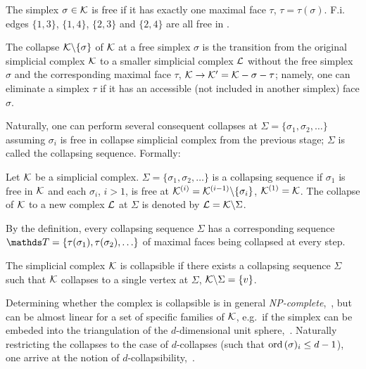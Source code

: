 \begin{definition}\label{def:free}
      The simplex \(\sigma \in \mathcal{K} \) is {free} if it has exactly one maximal face \( \tau \), \( \tau = \tau(\sigma) \). F.i. edges \( \{ 1, 3 \} \), \( \{ 1, 4 \} \), \( \{ 2, 3 \} \) and \( \{ 2, 4 \} \) are all free in .
\end{definition} 

 The {collapse} \( \mathcal{K} \backslash \{ \sigma \} \) of \( \mathcal{K} \) at a free simplex \( \sigma \) is the transition from the original simplicial complex \( \mathcal{K} \) to a smaller simplicial complex \( \mathcal{L} \) without the free simplex \( \sigma \) and the corresponding maximal face \( \tau \), \( \mathcal{K} \to \mathcal{K}' = \mathcal{K} - \sigma - \tau \); namely, one can eliminate a simplex \( \tau \) if it has an accessible (not included in another simplex) face \(\sigma\).

Naturally, one can perform several consequent collapses at  \( \Sigma = \{ \sigma_1, \sigma_2, \ldots \} \) assuming \( \sigma_i \) is free in collapse simplicial complex from the previous stage; \( \Sigma \) is called the {collapsing sequence}. Formally:
 \begin{definition}
       Let \( \mathcal{K} \) be a simplicial complex. \( \Sigma = \{ \sigma_1, \sigma_2, \ldots \} \) is a {collapsing sequence} if \( \sigma_1 \) is free in \( \mathcal{K} \) and each \( \sigma_i \), \( i > 1 \), is free at 
       \( \mathcal{K}^{(i)} = \mathcal{K}^{(i-1)} \backslash \{ \sigma_i \} \), \( \mathcal{K}^{(1)} = \mathcal{K} \). The collapse of \( \mathcal{K} \) to a new complex \( \mathcal{L} \) at \( \Sigma \) is denoted by \( \mathcal{L} = \mathcal{K} \backslash \Sigma \).
 \end{definition}
 By the definition, every collapsing sequence \( \Sigma \) has a corresponding sequence \( \ds T = \{ \tau(\sigma_1), \tau(\sigma_2), \ldots \} \) of maximal faces being collapsed at every step.

 \begin{definition}
      The simplicial complex \( \mathcal{K} \) is {collapsible} if there exists a collapsing sequence \( \Sigma \) such that \( \mathcal{K} \) collapses to a single vertex at \( \Sigma \), \( \mathcal{K} \backslash \Sigma = \{ v \} \).
\end{definition}

Determining whether the complex is collapsible is in general \emph{NP-complete},~\cite{tancerRecognitionCollapsibleComplexes2016}, but can be almost linear for a set of specific families of \( \mathcal{K} \), e.g.\ if the simplex can be embeded into the triangulation of the \(d\)-dimensional unit sphere,~\cite{cohenSolving1laplaciansNearly2014}. Naturally restricting the collapses to the case of \(d\)-collapses (such that \( \mathrm{ord}\,(\sigma)_i \le d-1 \)), one arrive at the notion of \(d\)-collapsibility,~\cite{tancerDcollapsibilityNPcomplete2009}.

